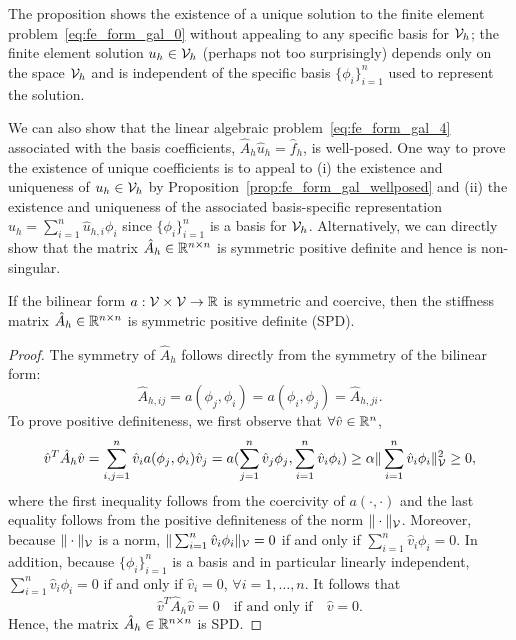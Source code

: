 The proposition shows the existence of a unique solution to the finite element problem~\eqref{eq:fe_form_gal_0} without appealing to any specific basis for $\mathcal{V}_h$; the finite element solution $u_h \in \mathcal{V}_h$ (perhaps not too surprisingly) depends only on the space $\mathcal{V}_h$ and is independent of the specific basis $\{ \phi_i \}_{i=1}^n$ used to represent the solution.

We can also show that the linear algebraic problem~\ref{eq:fe_form_gal_4} associated with the basis coefficients, $\hat A_h \hat u_h = \hat f_h$, is well-posed.  One way to prove the existence of unique coefficients is to appeal to (i) the existence and uniqueness of $u_h \in \mathcal{V}_h$ by Proposition~\eqref{prop:fe_form_gal_wellposed} and (ii) the existence and uniqueness of the associated basis-specific representation $u_h = \sum_{i=1}^n \hat u_{h,i} \phi_i$ since $\{\phi_i\}_{i=1}^n$ is a basis for $\mathcal{V}_h$. Alternatively, we can directly show that the matrix $\hat A_h \in \mathbb{R}^{n \times n}$ is symmetric positive definite and hence is non-singular. 
\begin{proposition}
  If the bilinear form $a: \mathcal{V} \times \mathcal{V} \to \mathbb{R}$ is symmetric and coercive, then the stiffness matrix $\hat A_h \in \mathbb{R}^{n \times n}$ is symmetric positive definite (SPD).
  \begin{proof}
    The symmetry of $\hat A_h$ follows directly from the symmetry of the bilinear form:
  \begin{equation*}
    \hat A_{h,ij} = a(\phi_j,\phi_i) = a(\phi_i,\phi_j) = \hat A_{h,ji}.
  \end{equation*}
  To prove positive definiteness, we first observe that $\forall \hat v \in \mathbb{R}^n$, 
\begin{equation*}
  \hat v^T \hat A_{h} \hat v
  =
  \sum_{i,j = 1}^n \hat v_i a(\phi_j, \phi_i) \hat v_j 
  = a(\sum_{j=1}^n \hat v_j \phi_j, \sum_{i=1}^n \hat v_i \phi_i)
  \geq \alpha \| \sum_{i=1}^n \hat v_i \phi_i \|^2_{\mathcal{V}} \geq 0,
\end{equation*}
where the first inequality follows from the coercivity of $a(\cdot,\cdot)$ and the last equality follows from the positive definiteness of the norm $\| \cdot \|_{\mathcal{V}}$. Moreover, because $\| \cdot \|_{\mathcal{V}}$ is a norm, $\| \sum_{i=1}^n \hat v_i \phi_i \|_{\mathcal{V}} = 0$ if and only if $\sum_{i=1}^n \hat v_i \phi_i = 0$.  In addition, because $\{\phi_i\}_{i=1}^n$ is a basis and in particular linearly independent, $\sum_{i=1}^n \hat v_i \phi_i = 0$ if and only if $\hat v_i = 0$, $\forall i = 1,\dots,n$. It follows that
\begin{equation*}
  \hat v^T \hat A_h \hat v = 0 \quad \text{if and only if} \quad \hat v = 0.
\end{equation*}
Hence, the matrix $\hat A_h \in \mathbb{R}^{n \times n}$ is SPD.
  \end{proof}
\end{proposition}


